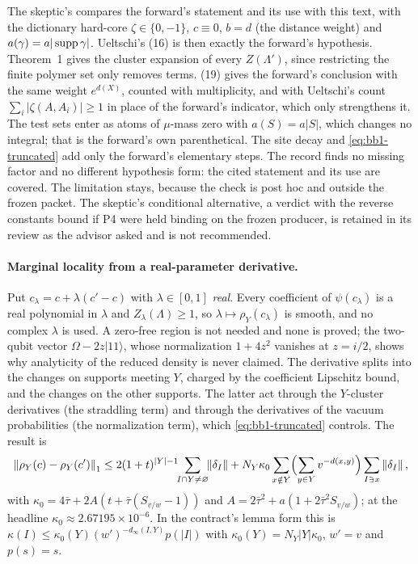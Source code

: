 The skeptic's
 compares the
forward's statement and its use with this text, with the dictionary
hard-core $\zeta\in\{0,-1\}$, $c\equiv0$, $b=d$ (the distance weight) and
$a(\gamma)=a|\operatorname{supp}\gamma|$. Ueltschi's (16) is then exactly the forward's
hypothesis. Theorem~1 gives the cluster expansion of every $Z(\Lambda')$, since
restricting the finite polymer set only removes terms. (19) gives the forward's
conclusion with the same weight $e^{d(X)}$, counted with multiplicity, and
with Ueltschi's count $\sum_i|\zeta(A,A_i)|\ge1$ in place of the forward's
indicator, which only strengthens it. The test sets enter as atoms of
$\mu$-mass zero with $a(S)=a|S|$, which changes no integral; that is the
forward's own parenthetical. The site decay and \eqref{eq:bb1-truncated} add
only the forward's elementary steps. The record finds no missing factor and
no different hypothesis form: the cited statement and its use are covered.
The limitation stays, because the check is post hoc and outside the frozen
packet. The skeptic's conditional alternative, a  verdict with
the reverse constants bound if P4 were held binding on the frozen producer,
is retained in its review as the advisor asked and is not recommended.

\paragraph{Marginal locality from a real-parameter derivative.} Put
$c_\lambda=c+\lambda(c'-c)$ with $\lambda\in[0,1]$ \emph{real}. Every
coefficient of $\psi(c_\lambda)$ is a real polynomial in $\lambda$ and
$Z_\lambda(\Lambda)\ge1$, so $\lambda\mapsto\rho_Y(c_\lambda)$ is smooth, and
no complex $\lambda$ is used. A zero-free region is not needed and none is
proved; the two-qubit vector $\Omega-2z|11\rangle$, whose normalization
$1+4z^2$ vanishes at $z=i/2$, shows why analyticity of the reduced density is
never claimed. The derivative splits into the changes on supports meeting
$Y$, charged by the coefficient Lipschitz bound, and the changes on the other
supports. The latter act through the $Y$-cluster derivatives (the straddling
term) and through the derivatives of the vacuum probabilities (the
normalization term), which \eqref{eq:bb1-truncated} controls. The result is
\begin{equation}
 \left\lVert\rho_Y(c)-\rho_Y(c')\right\rVert_1\le2(1+t)^{|Y|-1}\!\!\sum_{I\cap Y\ne\varnothing}\!\!\left\lVert\delta_I\right\rVert
 +N_Y\kappa_0\sum_{x\notin Y}\Bigl(\sum_{y\in Y}v^{-d(x,y)}\Bigr)\sum_{I\ni x}\left\lVert\delta_I\right\rVert,
 \label{eq:bb1-forward-lemma}
\end{equation}
with $\kappa_0=4\bar\tau+2A(t+\bar\tau(S_{v/w}-1))$ and
$A=2\bar\tau^2+a(1+2\bar\tau^2S_{v/w})$; at the headline
$\kappa_0\approx2.67195\times10^{-6}$. In the contract's lemma form this is
$\kappa(I)\le\kappa_0(Y)(w')^{-d_\infty(I,Y)}p(|I|)$ with
$\kappa_0(Y)=N_Y|Y|\kappa_0$, $w'=v$ and $p(s)=s$.

